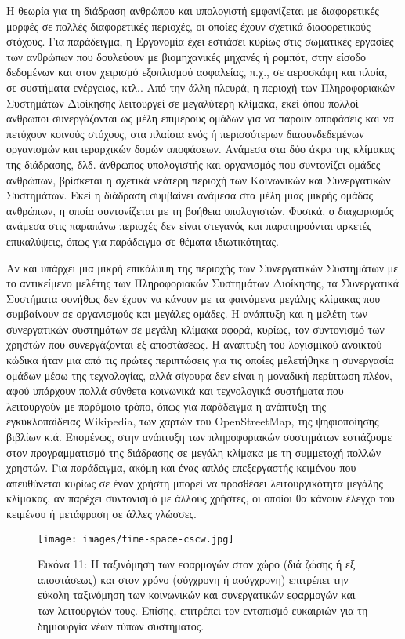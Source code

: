 \documentclass[
]{article}
\begin{document}
Η θεωρία για τη διάδραση ανθρώπου και υπολογιστή εμφανίζεται με
διαφορετικές μορφές σε πολλές διαφορετικές περιοχές, οι οποίες έχουν
σχετικά διαφορετικούς στόχους. Για παράδειγμα, η Εργονομία έχει εστιάσει
κυρίως στις σωματικές εργασίες των ανθρώπων που δουλεύουν με
βιομηχανικές μηχανές ή ρομπότ, στην είσοδο δεδομένων και στον χειρισμό
εξοπλισμού ασφαλείας, π.χ., σε αεροσκάφη και πλοία, σε συστήματα
ενέργειας, κτλ.. Από την άλλη πλευρά, η περιοχή των Πληροφοριακών
Συστημάτων Διοίκησης λειτουργεί σε μεγαλύτερη κλίμακα, εκεί όπου πολλοί
άνθρωποι συνεργάζονται ως μέλη επιμέρους ομάδων για να πάρουν αποφάσεις
και να πετύχουν κοινούς στόχους, στα πλαίσια ενός ή περισσότερων
διασυνδεδεμένων οργανισμών και ιεραρχικών δομών αποφάσεων. Ανάμεσα στα
δύο άκρα της κλίμακας της διάδρασης, δλδ. άνθρωπος-υπολογιστής και
οργανισμός που συντονίζει ομάδες ανθρώπων, βρίσκεται η σχετικά νεότερη
περιοχή των Κοινωνικών και Συνεργατικών Συστημάτων. Εκεί η διάδραση
συμβαίνει ανάμεσα στα μέλη μιας μικρής ομάδας ανθρώπων, η οποία
συντονίζεται με τη βοήθεια υπολογιστών. Φυσικά, ο διαχωρισμός ανάμεσα
στις παραπάνω περιοχές δεν είναι στεγανός και παρατηρούνται αρκετές
επικαλύψεις, όπως για παράδειγμα σε θέματα ιδιωτικότητας.

Αν και υπάρχει μια μικρή επικάλυψη της περιοχής των Συνεργατικών
Συστημάτων με το αντικείμενο μελέτης των Πληροφοριακών Συστημάτων
Διοίκησης, τα Συνεργατικά Συστήματα συνήθως δεν έχουν να κάνουν με τα
φαινόμενα μεγάλης κλίμακας που συμβαίνουν σε οργανισμούς και μεγάλες
ομάδες. Η ανάπτυξη και η μελέτη των συνεργατικών συστημάτων σε μεγάλη
κλίμακα αφορά, κυρίως, τον συντονισμό των χρηστών που συνεργάζονται εξ
αποστάσεως. Η ανάπτυξη του λογισμικού ανοικτού κώδικα ήταν μια από τις
πρώτες περιπτώσεις για τις οποίες μελετήθηκε η συνεργασία ομάδων μέσω
της τεχνολογίας, αλλά σίγουρα δεν είναι η μοναδική περίπτωση πλέον, αφού
υπάρχουν πολλά σύνθετα κοινωνικά και τεχνολογικά συστήματα που
λειτουργούν με παρόμοιο τρόπο, όπως για παράδειγμα η ανάπτυξη της
εγκυκλοπαίδειας Wikipedia, των χαρτών του OpenStreetMap, της
ψηφιοποίησης βιβλίων κ.ά. Επομένως, στην ανάπτυξη των πληροφοριακών
συστημάτων εστιάζουμε στον προγραμματισμό της διάδρασης σε μεγάλη
κλίμακα με τη συμμετοχή πολλών χρηστών. Για παράδειγμα, ακόμη και ένας
απλός επεξεργαστής κειμένου που απευθύνεται κυρίως σε έναν χρήστη μπορεί
να προσθέσει λειτουργικότητα μεγάλης κλίμακας, αν παρέχει συντονισμό με
άλλους χρήστες, οι οποίοι θα κάνουν έλεγχο του κειμένου ή μετάφραση σε
άλλες γλώσσες.

\leavevmode{}%
\begin{figure}
\hypertarget{fig:time-space-cscw}{%
\centering
\texttt{[image: images/time-space-cscw.jpg]}
\caption{Εικόνα 11: Η ταξινόμηση των εφαρμογών στον χώρο (διά ζώσης ή εξ
αποστάσεως) και στον χρόνο (σύγχρονη ή ασύγχρονη) επιτρέπει την εύκολη
ταξινόμηση των κοινωνικών και συνεργατικών εφαρμογών και των λειτουργιών
τους. Επίσης, επιτρέπει τον εντοπισμό ευκαιριών για τη δημιουργία νέων
τύπων συστήματος.}\label{fig:time-space-cscw}
}
\end{figure}
\end{document}
